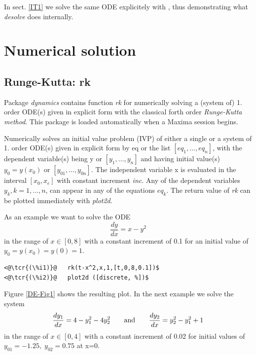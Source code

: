 \documentclass[../Maxima_Workbook.tex]{subfiles}
\begin{document}
\lz In sect. \ref{IT1} we solve the same ODE explicitely with , thus demonstrating what \emph{desolve} does internally. 

\section{Numerical solution }

\subsection{Runge-Kutta: rk}

Package \emph{dynamics} contains function \emph{rk} for numerically solving a (system of) 1. order ODE(s) given in explicit form with the classical forth order \emph{Runge-Kutta method}. This package is loaded automatically when a Maxima session begins.

\lzz {}

\hfill \tcr{[function]}

\lz Numerically solves an initial value problem (IVP) of either a single or a system of 1. order ODE(s) given in explicit form by eq or the list $ [ eq_1,\dots,eq_n] $, with the dependent variable(s) being y or $ [ y_1,\dots,y_n ] $ and having initial value(s) $ y_0=y(x_0) $ or $ [y_{01},\dots,y_{0n}] $. The independent variable x is evaluated in the interval $ [x_0,x_e] $ with constant increment \emph{inc}. Any of the dependent variables $ y_k, k=1,\dots,n $, can appear in any of the equations $ eq_k $. The return value of \emph{rk} can be plotted immediately with \emph{plot2d}.

\lz As an example we want to solve the ODE
\begin{equation*}
	\frac{dy}{dx} = x - y^2
\end{equation*}
in the range of $ x \in [0,8] $ with a constant increment of 0.1 for an initial value of $ y_0=y(x_0)=y(0)=1 $.

\lz \begin{small}
\color{blue}
\begin{lstlisting}
<@\tcr{(\%i1)}@   rk(t-x^2,x,1,[t,0,8,0.1])$
<@\tcr{(\%i2)}@   plot2d ([discrete, %])$
\end{lstlisting}
\color{black}
\end{small}

\lz Figure \ref{DE-Fig1} shows the resulting plot. In the next example we solve the system
\begin{equation*}
	\frac{dy_1}{dx}=4-y_1^2-4y_2^2 \qquad \text{and} \qquad \frac{dy_2}{dx}=y_2^2-y_1^2+1
\end{equation*}
in the range of $ x \in [0,4] $ with a constant increment of 0.02 for initial values of $ y_{01}=-1.25, \; y_{02}=0.75 $ at x=0.
\end{document}
